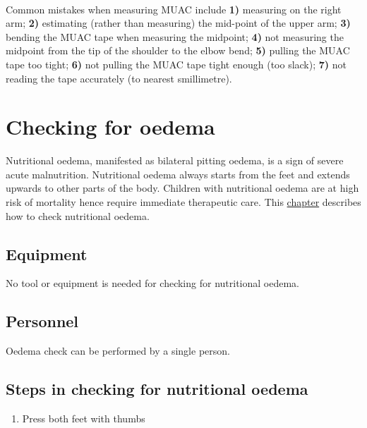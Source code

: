 \documentclass[12pt,]{book}
\providecommand{\tightlist}{%
  \setlength{\itemsep}{0pt}\setlength{\parskip}{0pt}}
\theoremstyle{definition}
\theoremstyle{definition}
\theoremstyle{definition}
\theoremstyle{remark}
\let\BeginKnitrBlock\begin \let\EndKnitrBlock\end
\begin{document}
~

\BeginKnitrBlock{rmdwarning}
Common mistakes when measuring MUAC include \textbf{1)} measuring on the
right arm; \textbf{2)} estimating (rather than measuring) the mid-point
of the upper arm; \textbf{3)} bending the MUAC tape when measuring the
midpoint; \textbf{4)} not measuring the midpoint from the tip of the
shoulder to the elbow bend; \textbf{5)} pulling the MUAC tape too tight;
\textbf{6)} not pulling the MUAC tape tight enough (too slack);
\textbf{7)} not reading the tape accurately (to nearest smillimetre).
\EndKnitrBlock{rmdwarning}

\hypertarget{oedema}{%
\chapter{Checking for oedema}\label{oedema}}

Nutritional oedema, manifested as bilateral pitting oedema, is a sign of
severe acute malnutrition. Nutritional oedema always starts from the
feet and extends upwards to other parts of the body. Children with
nutritional oedema are at high risk of mortality hence require immediate
therapeutic care. This \protect\hyperlink{oedema}{chapter} describes how
to check nutritional oedema.

\hypertarget{equipment-3}{%
\section{Equipment}\label{equipment-3}}

No tool or equipment is needed for checking for nutritional oedema.

\hypertarget{personnel-3}{%
\section{Personnel}\label{personnel-3}}

Oedema check can be performed by a single person.

\hypertarget{steps-in-checking-for-nutritional-oedema}{%
\section{Steps in checking for nutritional
oedema}\label{steps-in-checking-for-nutritional-oedema}}

\begin{enumerate}
\def\labelenumi{\arabic{enumi}.}
\tightlist
\item
  Press both feet with thumbs
\end{enumerate}
\end{document}
